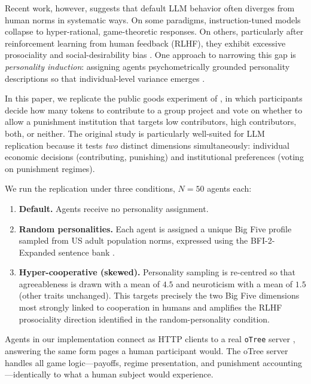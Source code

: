 \documentclass[12pt, a4paper]{article}
\begin{document}
Recent work, however, suggests that default LLM behavior often diverges from human norms in systematic ways. On some paradigms, instruction-tuned models collapse to hyper-rational, game-theoretic responses. On others, particularly after reinforcement learning from human feedback (RLHF), they exhibit excessive prosociality and social-desirability bias \citep{salecha2024social}. One approach to narrowing this gap is \emph{personality induction}: assigning agents psychometrically grounded personality descriptions so that individual-level variance emerges \citep{serapio2023personality, jiang2024personallm}.

In this paper, we replicate the public goods experiment of \citet{ertan2009who}, in which participants decide how many tokens to contribute to a group project and vote on whether to allow a punishment institution that targets low contributors, high contributors, both, or neither. The original study is particularly well-suited for LLM replication because it tests \emph{two} distinct dimensions simultaneously: individual economic decisions (contributing, punishing) and institutional preferences (voting on punishment regimes).

We run the replication under three conditions, $N=50$ agents each:
\begin{enumerate}
  \item \textbf{Default.} Agents receive no personality assignment.
  \item \textbf{Random personalities.} Each agent is assigned a unique Big Five profile sampled from US adult population norms, expressed using the BFI-2-Expanded sentence bank \citep{soto2017bfi2}.
  \item \textbf{Hyper-cooperative (skewed).} Personality sampling is re-centred so that agreeableness is drawn with a mean of $4.5$ and neuroticism with a mean of $1.5$ (other traits unchanged). This targets precisely the two Big Five dimensions most strongly linked to cooperation in humans \citep{volk2012personality} and amplifies the RLHF prosociality direction identified in the random-personality condition.
\end{enumerate}

Agents in our implementation connect as HTTP clients to a real \texttt{oTree} server \citep{otree}, answering the same form pages a human participant would. The oTree server handles all game logic---payoffs, regime presentation, and punishment accounting---identically to what a human subject would experience.
\end{document}
